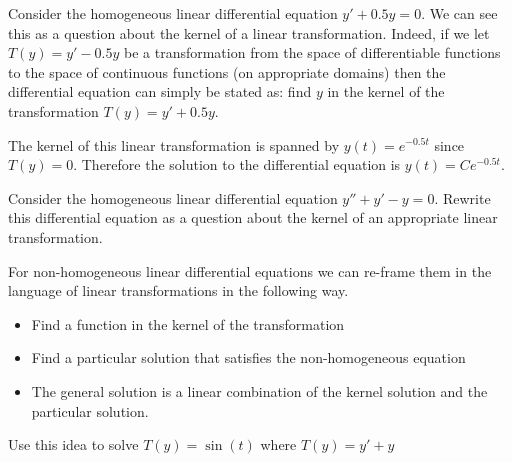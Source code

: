 \begin{example}
    Consider the homogeneous linear differential equation $y' + 0.5 y = 0$.  We can see this as a
    question about the kernel of a linear transformation.  Indeed, if we let $T(y) = y' -
    0.5y$ be a transformation from the space of differentiable functions to the space of
    continuous functions (on appropriate domains) then the differential equation can
    simply be stated as: find $y$ in the kernel of the transformation $T(y) = y' + 0.5y$. 

    The kernel of this linear transformation is spanned by $y(t) = e^{-0.5t}$ since $T(y)
    = 0$.  Therefore the solution to the differential equation is $y(t) = C e^{-0.5t}$.
\end{example}

\begin{problem}
    Consider the homogeneous linear differential equation $y'' + y' - y = 0$.  Rewrite this
    differential equation as a question about the kernel of an appropriate linear
    transformation.
\end{problem}

\begin{problem}
    For non-homogeneous linear differential equations we can re-frame them in the language
    of linear transformations in the following way.  
    \begin{itemize}
        \item Find a function in the kernel of the transformation
        \item Find a particular solution that satisfies the non-homogeneous equation
        \item The general solution is a linear combination of the kernel solution and the
            particular solution.
    \end{itemize}
    Use this idea to solve $T(y) = \sin(t)$ where $T(y) = y' + y$
\end{problem}

